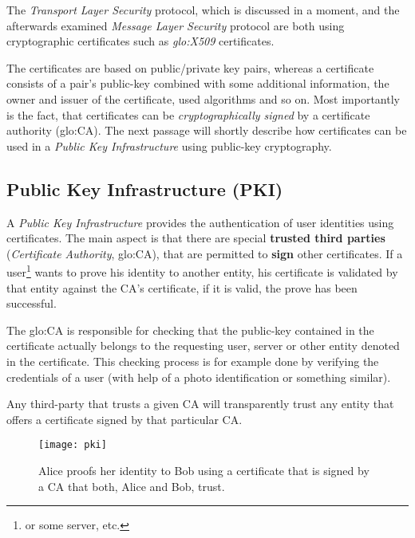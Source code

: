 The  \emph{Transport Layer  Security} protocol,  which is  discussed  in a
moment, and the afterwards examined \emph{Message Layer Security} protocol
are  both using cryptographic  certificates such  as \emph{\gls{glo:X509}}
certificates.

The  certificates  are  based  on  public/private  key  pairs,  whereas  a
certificate consists of a  pair's public-key combined with some additional
information, \eg the owner and issuer of the certificate, used algorithms
and  so  on.  Most  importantly  is the  fact,  that  certificates can  be
\emph{cryptographically    signed}     by    a    certificate    authority
(\gls{glo:CA}). The  next passage  will shortly describe  how certificates
can  be  used  in  a  \emph{Public Key  Infrastructure}  using  public-key
cryptography.


\subsection[Public Key Infrastructure]{Public Key Infrastructure (PKI)}

A  \emph{Public Key  Infrastructure} provides  the authentication  of user
identities using certificates.  The main  aspect is that there are special
\textbf{trusted    third     parties}    (\emph{Certificate    Authority},
\gls{glo:CA}), that are permitted  to \textbf{sign} other certificates. If
a  user\footnote{or some  server, etc.}   wants to  prove his  identity to
another entity,  his certificate is  validated by that entity  against the
CA's certificate, if it is valid, the prove has been successful.

The \gls{glo:CA} is responsible for checking that the public-key contained
in  the certificate  actually belongs  to the  requesting user,  server or
other  entity denoted  in the  certificate. This  checking process  is for
example done by  verifying the credentials of a user  (\eg with help of a
photo identification or something similar).

Any third-party that trusts a given CA will transparently trust any entity
that offers a certificate signed by that particular CA.

\begin{figure}[h]
  \centering
  \texttt{[image: pki]}
  \caption[Public  Key Infrastructure]{Alice  proofs her  identity  to Bob
    using a certificate  that is signed by a CA that  both, Alice and Bob,
    trust.}
  \label{fig:pki}
\end{figure}

